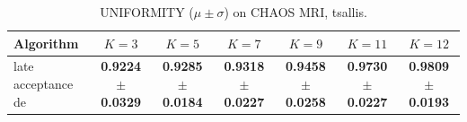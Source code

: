 \begin{table}[htbp]
\centering
\caption{UNIFORMITY ($\mu \pm \sigma$) on CHAOS MRI, tsallis.}
\label{tab:exp2-tsallis-uniformity}
\begin{tabular}{lcccccc}
\toprule
Algorithm & $K=3$ & $K=5$ & $K=7$ & $K=9$ & $K=11$ & $K=12$ \\
\midrule
late acceptance de & \textbf{0.9224 $\pm$ 0.0329} & \textbf{0.9285 $\pm$ 0.0184} & \textbf{0.9318 $\pm$ 0.0227} & \textbf{0.9458 $\pm$ 0.0258} & \textbf{0.9730 $\pm$ 0.0227} & \textbf{0.9809 $\pm$ 0.0193} \\
\bottomrule
\end{tabular}
\end{table}